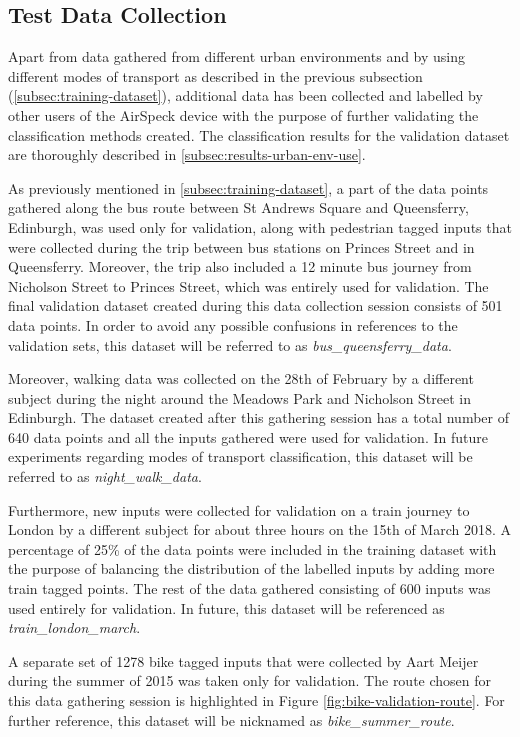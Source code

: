 \documentclass[bsc,frontabs,twoside,singlespacing, parskip,deptreport]{infthesis}     %
\begin{document}
\subsection{Test Data Collection}
\label{subsec:test-data-collection}

Apart from data gathered from different urban environments and by using different modes of transport as described in the previous subsection (\ref{subsec:training-dataset}), additional data has been collected and labelled by other users of the AirSpeck device with the purpose of further validating the classification methods created. The classification results for the validation dataset are thoroughly described in \ref{subsec:results-urban-env-use}.

As previously mentioned in \ref{subsec:training-dataset}, a part of the data points gathered along the bus route between St Andrews Square and Queensferry, Edinburgh, was used only for validation, along with pedestrian tagged inputs that were collected during the trip between bus stations on Princes Street and in Queensferry. Moreover, the trip also included a 12 minute bus journey from Nicholson Street to Princes Street, which was entirely used for validation. The final validation dataset created during this data collection session consists of 501 data points. In order to avoid any possible confusions in references to the validation sets, this dataset will be referred to as \textit{bus\_queensferry\_data}.

Moreover, walking data was collected on the 28th of February by a different subject during the night around the Meadows Park and Nicholson Street in Edinburgh. The dataset created after this gathering session has a total number of 640 data points and all the inputs gathered were used for validation. In future experiments regarding modes of transport classification, this dataset will be referred to as \textit{night\_walk\_data}.

Furthermore, new inputs were collected for validation on a train journey to London by a different subject for about three hours on the 15th of March 2018. A percentage of 25\% of the data points were included in the training dataset with the purpose of balancing the distribution of the labelled inputs by adding more train tagged points. The rest of the data gathered consisting of 600 inputs was used entirely for validation. In future, this dataset will be referenced as \textit{train\_london\_march}.

A separate set of 1278 bike tagged inputs that were collected by Aart Meijer during the summer of 2015 was taken only for validation. The route chosen for this data gathering session is highlighted in Figure \ref{fig:bike-validation-route}. For further reference, this dataset will be nicknamed as \textit{bike\_summer\_route}.
\end{document}
